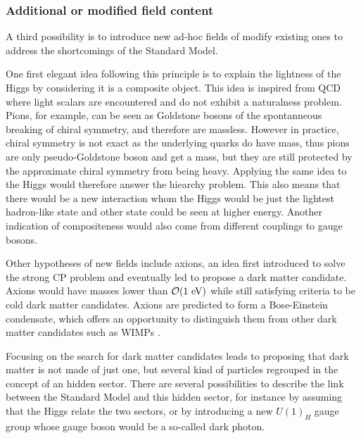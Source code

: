             \subsubsection{Additional or modified field content}

        A third possibility is to introduce new ad-hoc fields of modify existing ones
        to address the shortcomings of the Standard Model.

        One first elegant idea following this principle is to explain the lightness of the
        Higgs by considering it is a composite object. This idea is inspired from QCD where
        light scalars are encountered and do not exhibit a naturalness problem. Pions,
        for example, can be seen as Goldstone bosons of the spontanneous breaking of chiral
        symmetry, and therefore are massless. However in practice, chiral symmetry is not exact as
        the underlying quarks do have mass, thus pions are only pseudo-Goldstone boson and get a mass,
        but they are still protected by the approximate chiral symmetry from being heavy.
        Applying the same idea to the Higgs would therefore answer the hiearchy problem.
        This also means that there would be a new interaction whom the Higgs would
        be just the lightest hadron-like state and other state could be seen at higher
        energy. Another indication of compositeness would also come from different couplings
        to gauge bosons.

        \cite{PecceiQuinnAxion} Other hypotheses of new fields include axions, an idea first introduced to solve
        the strong CP problem and eventually led to propose a dark matter candidate.
        Axions would have masses lower than $\mathcal{O}(1~\text{eV})$ while still satisfying
        criteria to be cold dark matter candidates. Axions are predicted to form a Bose-Einstein
        condensate, which offers an opportunity to distinguish them from other dark matter
        candidates such as WIMPs \cite{AxionBoseEinstein}.


        Focusing on the search for dark matter candidates leads to proposing that dark matter
        is not made of just one, but several kind of particles regrouped in the concept
        of an hidden sector. There are several possibilities to describe the link between
        the Standard Model and this hidden sector, for instance by assuming that the Higgs
        relate the two sectors, or by introducing a new $U(1)_H$ gauge group whose gauge
        boson would be a so-called dark photon.

